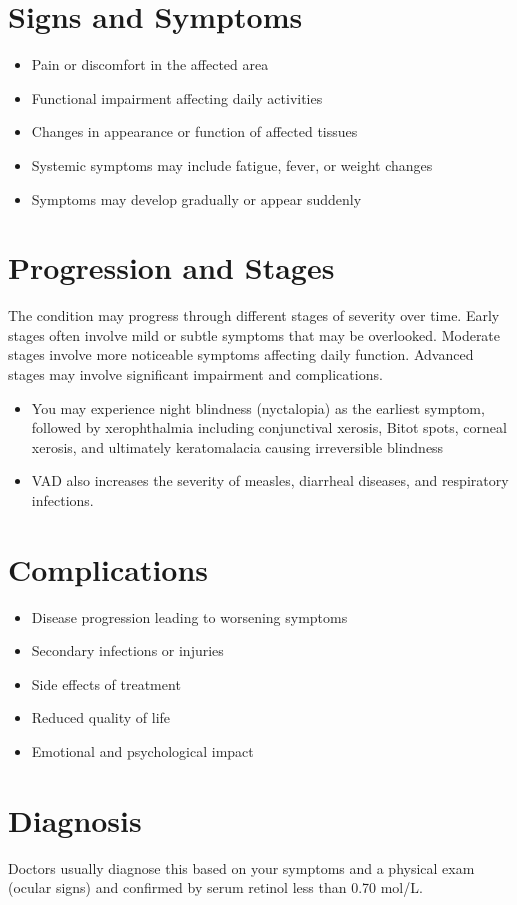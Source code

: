 \section{Signs and Symptoms}
\begin{itemize}[noitemsep]
  \item Pain or discomfort in the affected area
  \item Functional impairment affecting daily activities
  \item Changes in appearance or function of affected tissues
  \item Systemic symptoms may include fatigue, fever, or weight changes
  \item Symptoms may develop gradually or appear suddenly
\end{itemize}
\section{Progression and Stages}
The condition may progress through different stages of severity over time. Early stages often involve mild or subtle symptoms that may be overlooked. Moderate stages involve more noticeable symptoms affecting daily function. Advanced stages may involve significant impairment and complications.

\begin{itemize}[noitemsep]
  \item You may experience night blindness (nyctalopia) as the earliest symptom, followed by xerophthalmia including conjunctival xerosis, Bitot spots, corneal xerosis, and ultimately keratomalacia causing irreversible blindness
  \item VAD also increases the severity of measles, diarrheal diseases, and respiratory infections.
\end{itemize}
\section{Complications}
\begin{itemize}[noitemsep]
  \item Disease progression leading to worsening symptoms
  \item Secondary infections or injuries
  \item Side effects of treatment
  \item Reduced quality of life
  \item Emotional and psychological impact
\end{itemize}
\section{Diagnosis}
Doctors usually diagnose this based on your symptoms and a physical exam (ocular signs) and confirmed by serum retinol less than 0.70 \textmu mol/L.

